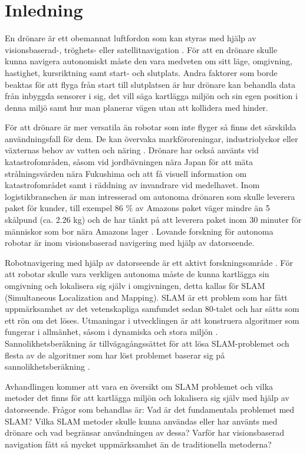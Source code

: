 \chapter{Inledning}

En drönare är ett obemannat luftfordon som kan styras med hjälp av visionsbaserad-, tröghets- eller satellitnavigation \citep{geospatial}. För att en drönare skulle kunna navigera autonomiskt måste den vara medveten om sitt läge, omgivning, hastighet, kursriktning samt start- och slutplats. Andra faktorer som borde beaktas för att flyga från start till slutplatsen är hur drönare kan behandla data från inbyggda sensorer i sig, det vill säga kartlägga miljön och sin egen position i denna miljö samt hur man planerar vägen utan att kollidera med hinder.

För att drönare är mer versatila än robotar som inte flyger så finns det särskilda användningsfall för dem. De kan övervaka markföroreningar, industriolyckor eller växternas behov av vatten och näring \citep{crowdsurveillance}. Drönare har också använts vid katastrofområden, såsom vid jordbävningen nära Japan för att mäta strålningsvärden nära Fukushima och att få visuell information om katastrofområdet samt i räddning av invandrare vid medelhavet. Inom logistikbranschen är man intresserad om autonoma drönaren som skulle leverera paket för kunder, till exempel 86 \% av Amazons paket väger mindre än 5 skålpund (ca. 2.26 kg) och de har tänkt på att leverera paket inom 30 minuter för människor som bor nära Amazons lager \citep{cbsnews}. Lovande forskning för autonoma robotar är inom visionsbaserad navigering med hjälp av datorseende.

Robotnavigering med hjälp av datorseende är ett aktivt forskningsområde \citep{982903}. För att robotar skulle vara verkligen autonoma måste de kunna kartlägga sin omgivning och lokalisera sig själv i omgivningen, detta kallas för SLAM (Simultaneous Localization and Mapping). SLAM är ett problem som har fått uppmärksamhet av det vetenskapliga samfundet sedan 80-talet och har sätts som ett rön om det löses. Utmaningar i utvecklingen är att konstruera algoritmer som fungerar i allmänhet, såsom i dynamiska och stora miljön \citep{realslamproblem}. Sannolikhetsberäkning är tillvägagångssättet för att lösa SLAM-problemet och flesta av de algoritmer som har löst problemet baserar sig på sannolikhetsberäkning \citep{ProbabilisticRobotics}.

Avhandlingen kommer att vara en översikt om SLAM problemet och vilka metoder det finns för att kartlägga miljön och lokalisera sig själv med hjälp av datorseende. Frågor som behandlas är: Vad är det fundamentala problemet med SLAM? Vilka SLAM metoder skulle kunna användas eller har använts med drönare och vad begränsar användningen av dessa? Varför har visionsbaserad navigation fått så mycket uppmärksamhet än de traditionella metoderna?


